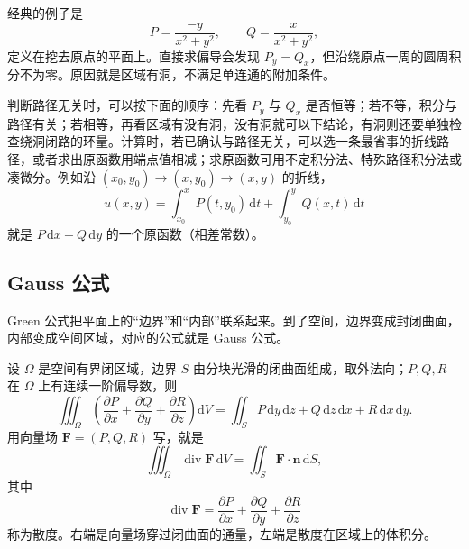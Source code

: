 经典的例子是
\[
    P=\frac{-y}{x^2+y^2},\qquad Q=\frac{x}{x^2+y^2},
\]
定义在挖去原点的平面上。直接求偏导会发现 $P_y=Q_x$，但沿绕原点一周的圆周积分不为零。原因就是区域有洞，不满足单连通的附加条件。

判断路径无关时，可以按下面的顺序：先看 $P_y$ 与 $Q_x$ 是否恒等；若不等，积分与路径有关；若相等，再看区域有没有洞，没有洞就可以下结论，有洞则还要单独检查绕洞闭路的环量。计算时，若已确认与路径无关，可以选一条最省事的折线路径，或者求出原函数用端点值相减；求原函数可用不定积分法、特殊路径积分法或凑微分。例如沿 $(x_0,y_0)\to(x,y_0)\to(x,y)$ 的折线，
\[
    u(x,y)=\int_{x_0}^{x}P(t,y_0)\,\mathrm dt
    +\int_{y_0}^{y}Q(x,t)\,\mathrm dt
\]
就是 $P\,\mathrm dx+Q\,\mathrm dy$ 的一个原函数（相差常数）。

\subsection{Gauss 公式}

Green 公式把平面上的“边界”和“内部”联系起来。到了空间，边界变成封闭曲面，内部变成空间区域，对应的公式就是 Gauss 公式。

设 $\Omega$ 是空间有界闭区域，边界 $S$ 由分块光滑的闭曲面组成，取外法向；$P,Q,R$ 在 $\Omega$ 上有连续一阶偏导数，则
\[
    \iiint_\Omega\left(
    \frac{\partial P}{\partial x}
    +\frac{\partial Q}{\partial y}
    +\frac{\partial R}{\partial z}\right)\mathrm dV
    =\iint_S P\,\mathrm dy\,\mathrm dz
    +Q\,\mathrm dz\,\mathrm dx
    +R\,\mathrm dx\,\mathrm dy .
\]
用向量场 $\mathbf F=(P,Q,R)$ 写，就是
\[
    \iiint_\Omega \operatorname{div}\mathbf F\,\mathrm dV
    =\iint_S \mathbf F\cdot\mathbf n\,\mathrm dS,
\]
其中
\[
    \operatorname{div}\mathbf F
    =\frac{\partial P}{\partial x}
    +\frac{\partial Q}{\partial y}
    +\frac{\partial R}{\partial z}
\]
称为散度。右端是向量场穿过闭曲面的通量，左端是散度在区域上的体积分。

